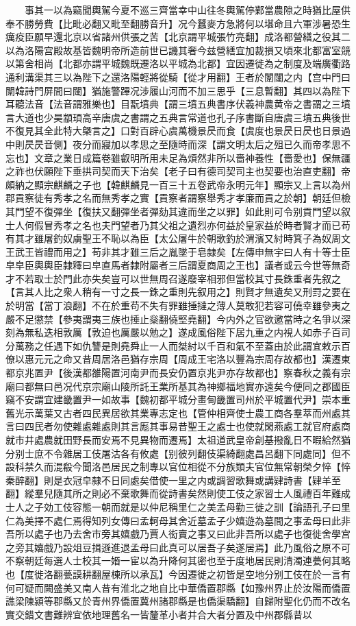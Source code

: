 　　事其一以為竊聞輿駕今夏不巡三齊當幸中山往冬輿駕停鄴當農隙之時猶比屋供奉不勝勞費【比毗必翻又毗至翻勝音升】况今蠶麥方急將何以堪命且六軍涉暑恐生癘疫臣願早還北京以省諸州供張之苦【北京謂平城張竹亮翻】成洛都營繕之役其二以為洛陽宫殿故基皆魏明帝所造前世已譏其奢今兹營繕宜加裁損又頃來北都富室競以第舍相尚【北都亦謂平城魏既遷洛以平城為北都】宜因遷徙為之制度及端廣衢路通利溝渠其三以為陛下之還洛陽輕將從騎【從才用翻】王者於闈闥之内【宫中門曰闈韓詩門屏間曰闥】猶施警蹕况涉履山河而不加三思乎【三息暫翻】其四以為陛下耳聽法音【法音謂雅樂也】目翫墳典【謂三墳五典書序伏羲神農黄帝之書謂之三墳言大道也少昊顓頊高辛唐虞之書謂之五典言常道也孔子序書斷自唐虞三墳五典後世不復見其全此特大槩言之】口對百辟心虞萬機景昃而食【虞度也景昃日昃也日景過中則昃昃音側】夜分而寢加以孝思之至隨時而深【謂文明太后之殂已久而帝孝思不忘也】文章之業日成篇卷雖叡明所用未足為煩然非所以嗇神養性【嗇愛也】保無疆之祚也伏願陛下垂拱司契而天下治矣【老子曰有德司契司主也契要也治直吏翻】帝頗納之顯宗麒麟之子也【韓麒麟見一百三十五卷武帝永明元年】顯宗又上言以為州郡貢察徒有秀孝之名而無秀孝之實【貢察者謂察舉秀才孝廉而貢之於朝】朝廷但檢其門望不復彈坐【復扶又翻彈坐者彈劾其違而坐之以罪】如此則可令别貢門望以叙士人何假冒秀孝之名也夫門望者乃其父祖之遺烈亦何益於皇家益於時者賢才而已苟有其才雖屠釣奴虜聖王不恥以為臣【太公屠牛於朝歌釣於渭濱又紂時箕子為奴周文王武王皆禮而用之】苟非其才雖三后之胤墜于皂隸矣【左傳申無宇曰人有十等士臣皁皁臣輿輿臣隸釋曰皁直馬者隸附屬者三后謂夏商周之王也】議者或云今世等無奇才不若取士於門此亦失矣豈可以世無周召遂廢宰相邪但當校其寸長銖重者先叙之【言其人比之衆人稍有一寸之長一銖之重則先叙用之】則賢才無遺矣又刑罸之要在於明當【當丁浪翻】不在於重苟不失有罪雖捶撻之薄人莫敢犯若容可僥幸雖參夷之嚴不足懲禁【參夷謂夷三族也捶止橤翻僥堅堯翻】今内外之官欲邀當時之名爭以深刻為無私迭相敦厲【敦迫也厲嚴以勉之】遂成風俗陛下居九重之内視人如赤子百司分萬務之任遇下如仇讐是則堯舜止一人而桀紂以千百和氣不至蓋由於此謂宜敕示百僚以惠元元之命又昔周居洛邑猶存宗周【周成王宅洛以豐為宗周存故都也】漢遷東都京兆置尹【後漢都雒陽置河南尹而長安仍置京兆尹亦存故都也】察春秋之義有宗廟曰都無曰邑况代京宗廟山陵所託王業所基其為神鄉福地實亦遠矣今便同之郡國臣竊不安謂宜建畿置尹一如故事【魏初都平城分畫甸畿置司州於平城置代尹】崇本重舊光示萬葉又古者四民異居欲其業專志定也【管仲相齊使士農工商各羣萃而州處其言曰四民者勿使雜處雜處則其言厖其事易昔聖王之處士也使就閑燕處工就官府處商就市井處農就田野長而安焉不見異物而遷焉】太祖道武皇帝創基撥亂日不暇給然猶分别士庶不令雜居工伎屠沽各有攸處【别彼列翻伎渠綺翻處昌呂翻下同處同】但不設科禁久而混殽今聞洛邑居民之制專以官位相從不分族類夫官位無常朝榮夕悴【悴秦醉翻】則是衣冠皁隸不日同處矣借使一里之内或調習歌舞或講肄詩書【肄羊至翻】縱羣兒隨其所之則必不棄歌舞而從詩書矣然則使工伎之家習士人風禮百年難成士人之子効工伎容態一朝而就是以仲尼稱里仁之美孟母勤三徙之訓【論語孔子曰里仁為美擇不處仁焉得知列女傳曰孟軻母其舍近墓孟子少嬉遊為墓間之事孟母曰此非吾所以處子也乃去舍市旁其嬉戲乃賈人衒賣之事又曰此非吾所以處子也復徙舍學宫之旁其嬉戲乃設俎豆揖遜進退孟母曰此真可以居吾子矣遂居焉】此乃風俗之原不可不察朝廷每選人士校其一㛰一宦以為升降何其密也至于度地居民則清濁連甍何其略也【度徙洛翻甍謨耕翻屋棟所以承瓦】今因遷徙之初皆是空地分别工伎在於一言有何可疑而闕盛美又南人昔有淮北之地自比中華僑置郡縣【如豫州界止於汝陽而僑置譙梁陳潁等郡縣又於青州界僑置冀州諸郡縣是也僑渠驕翻】自歸附聖化仍而不改名實交錯文書難辨宜依地理舊名一皆釐革小者并合大者分置及中州郡縣昔以